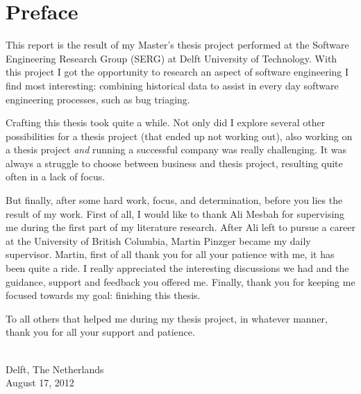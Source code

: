 \chapter{\label{cha:Preface}Preface}

This report is the result of my Master's thesis project performed at the Software Engineering Research Group (SERG) at Delft University of Technology. With this project I got the opportunity to research an aspect of software engineering I find most interesting: combining historical data to assist in every day software engineering processes, such as bug triaging.

Crafting this thesis took quite a while. Not only did I explore several other possibilities for a thesis project (that ended up not working out), also working on a thesis project \emph{and} running a successful company was really challenging. It was always a struggle to choose between business and thesis project, resulting quite often in a lack of focus.

But finally, after some hard work, focus, and determination, before you lies the result of my work. First of all, I would like to thank Ali Mesbah for supervising me during the first part of my literature research. After Ali left to pursue a career at the University of British Columbia, Martin Pinzger became my daily supervisor. Martin, first of all thank you for all your patience with me, it has been quite a ride. I really appreciated the interesting discussions we had and the guidance, support and feedback you offered me. Finally, thank you for keeping me focused towards my goal: finishing this thesis. 

To all others that helped me during my thesis project, in whatever manner, thank you for all your support and patience. 

\vskip1cm
\begin{flushright}
\theauthor\\
Delft, The Netherlands \\
August 17, 2012\\
\end{flushright}

